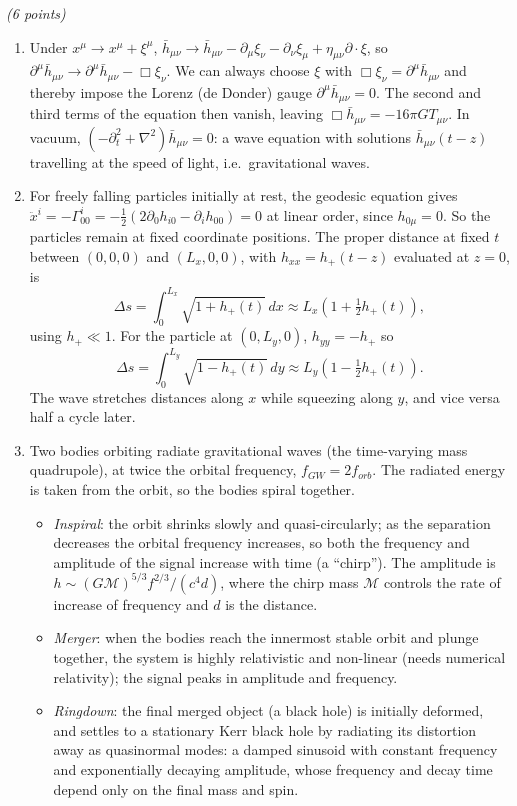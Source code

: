 \documentclass[12pt]{article}
\newcommand{\be}{\begin{equation}}
\newcommand{\ee}{\end{equation}}
\newcommand{\bh}{\bar{h}}
\newcounter{quesno}
\newcommand{\ques}[1]{\vspace{2em}\stepcounter{quesno}
\noindent{\bf Question \thequesno.} \emph{(#1 points)}\\
}
\begin{document}
\ques{6}
\begin{enumerate}[label=\alph*)]
\item Under $x^\mu\to x^\mu+\xi^\mu$, $\bh_{\mu\nu}\to\bh_{\mu\nu}-\partial_\mu\xi_\nu-\partial_\nu\xi_\mu+\eta_{\mu\nu}\partial\cdot\xi$, so $\partial^\mu\bh_{\mu\nu}\to\partial^\mu\bh_{\mu\nu}-\Box\xi_\nu$. We can always choose $\xi$ with $\Box\xi_\nu=\partial^\mu\bh_{\mu\nu}$ and thereby impose the Lorenz (de Donder) gauge $\partial^\mu\bh_{\mu\nu}=0$. The second and third terms of the equation then vanish, leaving $\Box\bh_{\mu\nu}=-16\pi G T_{\mu\nu}$. In vacuum, $(-\partial_t^2+\nabla^2)\bh_{\mu\nu}=0$: a wave equation with solutions $\bh_{\mu\nu}(t-z)$ travelling at the speed of light, i.e.\ gravitational waves.
\item For freely falling particles initially at rest, the geodesic equation gives $\ddot x^i=-\Gamma^i_{00}=-\frac12(2\partial_0h_{i0}-\partial_ih_{00})=0$ at linear order, since $h_{0\mu}=0$. So the particles remain at fixed coordinate positions. The proper distance at fixed $t$ between $(0,0,0)$ and $(L_x,0,0)$, with $h_{xx}=h_+(t-z)$ evaluated at $z=0$, is
\be
\Delta s=\int_0^{L_x}\sqrt{1+h_{+}(t)}\,dx\approx L_x\left(1+\tfrac12h_+(t)\right),
\ee
using $h_+\ll1$. For the particle at $(0,L_y,0)$, $h_{yy}=-h_+$ so
\be
\Delta s=\int_0^{L_y}\sqrt{1-h_{+}(t)}\,dy\approx L_y\left(1-\tfrac12h_+(t)\right).
\ee
The wave stretches distances along $x$ while squeezing along $y$, and vice versa half a cycle later.
\item Two bodies orbiting radiate gravitational waves (the time-varying mass quadrupole), at twice the orbital frequency, $f_{GW}=2f_{orb}$. The radiated energy is taken from the orbit, so the bodies spiral together.
\begin{itemize}
\item \emph{Inspiral}: the orbit shrinks slowly and quasi-circularly; as the separation decreases the orbital frequency increases, so both the frequency and amplitude of the signal increase with time (a ``chirp''). The amplitude is $h\sim (G\mathcal M)^{5/3}f^{2/3}/(c^4 d)$, where the chirp mass $\mathcal M$ controls the rate of increase of frequency and $d$ is the distance.
\item \emph{Merger}: when the bodies reach the innermost stable orbit and plunge together, the system is highly relativistic and non-linear (needs numerical relativity); the signal peaks in amplitude and frequency.
\item \emph{Ringdown}: the final merged object (a black hole) is initially deformed, and settles to a stationary Kerr black hole by radiating its distortion away as quasinormal modes: a damped sinusoid with constant frequency and exponentially decaying amplitude, whose frequency and decay time depend only on the final mass and spin.

\end{itemize}
\end{enumerate}
\end{document}
